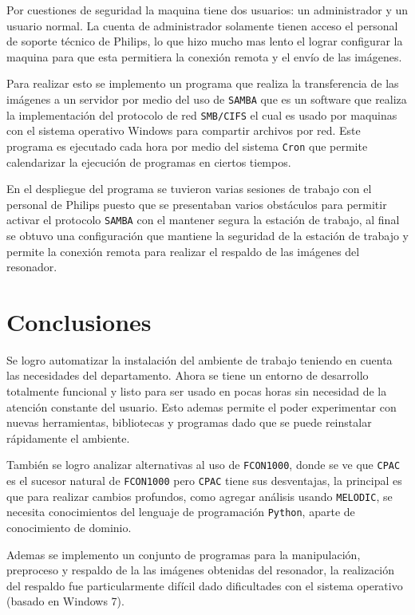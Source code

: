 \documentclass{article}
\begin{document}
Por cuestiones de seguridad la maquina tiene dos usuarios: un administrador y un usuario normal. La cuenta de administrador solamente tienen acceso el personal de soporte técnico de Philips, lo que hizo mucho mas lento el lograr configurar la maquina para que esta permitiera la conexión remota y el envío de las imágenes.

Para realizar esto se implemento un programa que realiza la transferencia de las imágenes a un servidor por medio del uso de \texttt{SAMBA} que es un software que realiza la implementación del protocolo de red \texttt{SMB/CIFS} el cual es usado por maquinas con el sistema operativo Windows para compartir archivos por red. Este programa es ejecutado cada hora por medio del sistema \texttt{Cron} que permite calendarizar la ejecución de programas en ciertos tiempos.

En el despliegue del programa se tuvieron varias sesiones de trabajo con el personal de Philips puesto que se presentaban varios obstáculos para permitir activar el protocolo \texttt{SAMBA} con el mantener segura la estación de trabajo, al final se obtuvo una configuración que mantiene la seguridad de la estación de trabajo y permite la conexión remota para realizar el respaldo de las imágenes del resonador.

\section{Conclusiones}

Se logro automatizar la instalación del ambiente de trabajo teniendo en cuenta las necesidades del departamento. Ahora se tiene un entorno de desarrollo totalmente funcional y listo para ser usado en pocas horas sin necesidad de la atención constante del usuario. Esto ademas permite el poder experimentar con nuevas herramientas, bibliotecas y programas dado que se puede reinstalar rápidamente el ambiente.

También se logro analizar alternativas al uso de \texttt{FCON1000}, donde se ve que \texttt{CPAC} es el sucesor natural de \texttt{FCON1000} pero \texttt{CPAC} tiene sus desventajas, la principal es que  para realizar cambios profundos, como agregar análisis usando \texttt{MELODIC}, se necesita conocimientos del lenguaje de programación \texttt{Python}, aparte de conocimiento de dominio.

Ademas se implemento un conjunto de programas  para la manipulación, preproceso y respaldo de la las imágenes obtenidas del resonador, la realización del respaldo fue particularmente difícil dado dificultades con el sistema operativo (basado en Windows 7).
\end{document}
